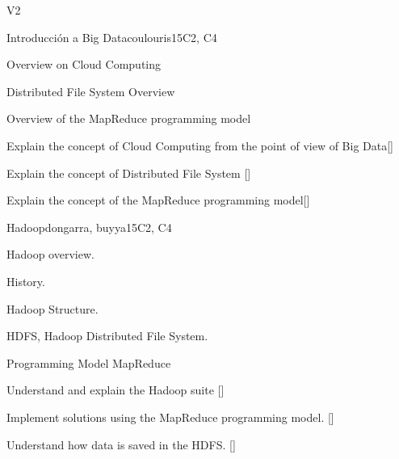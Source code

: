 \begin{syllabus}
\begin{competences}{V2}
    \item {}
    \item {} 
    \item {} 
    \item {} 
    \item {} 
\end{competences}

\begin{unit}{Introducción a Big Data}{}{coulouris}{15}{C2, C4}
\begin{topics}%
        \item Overview on Cloud Computing 
        \item Distributed File System Overview%
        \item Overview of the MapReduce programming model%
\end{topics}
\begin{learningoutcomes}%
        \item Explain the concept of Cloud Computing from the point of view of Big Data[\Familiarity] %
        \item Explain the concept of Distributed File System [\Familiarity] %
        \item Explain the concept of the MapReduce programming model[\Familiarity] %
\end{learningoutcomes}%
\end{unit}

\begin{unit}{Hadoop}{}{dongarra, buyya}{15}{C2, C4}
\begin{topics}
    \item Hadoop overview.
    \item History.
    \item Hadoop Structure.
    \item HDFS, Hadoop Distributed File System.
    \item Programming Model MapReduce
\end{topics}
\begin{learningoutcomes}
      \item Understand and explain the Hadoop suite [\Familiarity]
      \item Implement solutions using the MapReduce programming model. [\Usage]
      \item Understand how data is saved in the HDFS. [\Familiarity] %
\end{learningoutcomes}
\end{unit}


\end{syllabus}
